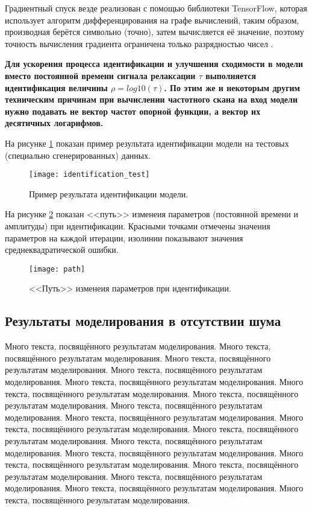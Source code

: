 	Градиентный спуск везде реализован с помощью библиотеки TensorFlow,
	которая использует алгоритм дифференцирования на графе вычислений,
	таким образом, производная берётся символьно (точно), затем вычисляется
	её значение, поэтому точность вычисления градиента ограничена только
	разрядностью чисел \cite{hands_on_ml}.

	\textbf{Для ускорения процесса идентификации и улучшения сходимости
	в модели вместо постоянной времени сигнала релаксации $\tau$ 
	выполняется идентификация величины $\rho = log10(\tau)$. По этим же
	и некоторым	другим техническим причинам при вычислении частотного 
	скана на вход модели нужно подавать не вектор частот опорной 
	функции, а вектор их десятичных логарифмов.}

	На рисунке \ref{pic:identification_test} показан пример результата
	идентификации модели на тестовых (специально сгенерированных) данных.

	\begin{figure}[h!]
		\centering
		\texttt{[image: identification\_test]}
		\caption{Пример результата идентификации модели.}
		\label{pic:identification_test}
	\end{figure}

	На рисунке \ref{pic:param_path} показан <<путь>> изменеия параметров 
	(постоянной времени и амплитуды) при идентификации. Красными точками 
	отмечены значения параметров на каждой итерации, изолинии показывают 
	значения среднеквадратической ошибки.

	\begin{figure}[h!]
		\centering
		\texttt{[image: path]}
		\caption{<<Путь>> изменеия параметров при идентификации.}
		\label{pic:param_path}
	\end{figure}


	\subsection{Результаты моделирования в отсутствии шума}
	Много текста, посвящённого результатам моделирования.
	Много текста, посвящённого результатам моделирования.
	Много текста, посвящённого результатам моделирования.
	Много текста, посвящённого результатам моделирования.
	Много текста, посвящённого результатам моделирования.
	Много текста, посвящённого результатам моделирования.
	Много текста, посвящённого результатам моделирования.
	Много текста, посвящённого результатам моделирования.
	Много текста, посвящённого результатам моделирования.
	Много текста, посвящённого результатам моделирования.
	Много текста, посвящённого результатам моделирования.
	Много текста, посвящённого результатам моделирования.
	Много текста, посвящённого результатам моделирования.
	Много текста, посвящённого результатам моделирования.
	Много текста, посвящённого результатам моделирования.
	Много текста, посвящённого результатам моделирования.
	Много текста, посвящённого результатам моделирования.
	Много текста, посвящённого результатам моделирования.

